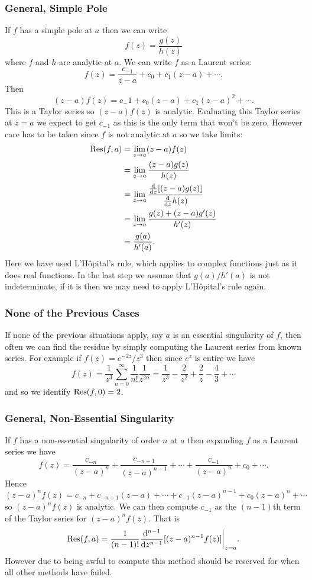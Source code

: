 \documentclass{article}
\begin{document}
    \subsubsection{General, Simple Pole}
    If \(f\) has a simple pole at \(a\) then we can write
    \[f(z) = \frac{g(z)}{h(z)}\]
    where \(f\) and \(h\) are analytic at \(a\).
    We can write \(f\) as a Laurent series:
    \[f(z) = \frac{c_{-1}}{z - a} + c_0 + c_1(z - a) + \dotsb.\]
    Then
    \[(z - a)f(z) = c_-1 + c_0(z - a) + c_1(z - a)^2 + \dotsb.\]
    This is a Taylor series so \((z - a)f(z)\) is analytic.
    Evaluating this Taylor series at \(z = a\) we expect to get \(c_{-1}\) as this is the only term that won't be zero.
    However care has to be taken since \(f\) is not analytic at \(a\) so we take limits:
    \begin{align*}
        \Res(f, a) &= \lim_{z\to a} (z - a)f(z)\\
        &= \lim_{z\to a} \frac{(z - a)g(z)}{h(z)}\\
        &= \lim_{z\to a} \frac{\dv{z}[(z - a)g(z)]}{\dv{z}h(z)}\\
        &= \lim_{z\to a} \frac{g(z) + (z - a)g'(z)}{h'(z)}\\
        &= \frac{g(a)}{h'(a)}.
    \end{align*}
    Here we have used L'H\^opital's rule, which applies to complex functions just as it does real functions.
    In the last step we assume that \(g(a)/h'(a)\) is not indeterminate, if it is then we may need to apply L'H\^opital's rule again.
    
    \subsubsection{None of the Previous Cases}
    If none of the previous situations apply, say \(a\) is an essential singularity of \(f\), then often we can find the residue by simply computing the Laurent series from known series.
    For example if \(f(z) = e^{-2z}/z^3\) then since \(e^z\) is entire we have
    \[f(z) = \frac{1}{z^3} \sum_{n=0}^{\infty} \frac{1}{n!}\frac{1}{z^{2n}} = \frac{1}{z^3} - \frac{2}{z^2} + \frac{2}{z} - \frac{4}{3} + \dotsb\]
    and so we identify \(\Res(f, 0) = 2\).
    
    \subsubsection{General, Non-Essential Singularity}
    If \(f\) has a non-essential singularity of order \(n\) at \(a\) then expanding \(f\) as a Laurent series we have
    \[f(z) = \frac{c_{-n}}{(z - a)^n} + \frac{c_{-n+1}}{(z - a)^{n-1}} + \dotsb + \frac{c_{-1}}{(z - a)^n} + c_0 + \dotsb.\]
    Hence
    \[(z - a)^nf(z) = c_{-n} + c_{-n+1}(z - a) + \dotsb + c_{-1}(z - a)^{n - 1} + c_{0}(z - a)^{n} + \dotsb\]
    so \((z - a)^nf(z)\) is analytic.
    We can then compute \(c_{-1}\) as the \((n - 1)\)th term of the Taylor series for \((z - a)^nf(z)\).
    That is
    \[\Res(f, a) = \frac{1}{(n - 1)!}\dv[n-1]{z}[(z - a)^{n-1}f(z)]\bigg|_{z=a}.\]
    However due to being awful to compute this method should be reserved for when all other methods have failed.
    
\end{document}
